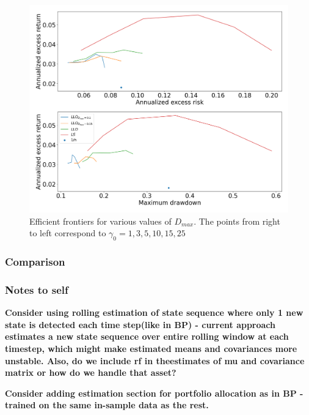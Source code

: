 \begin{figure}[H]
    \centering
    \includegraphics[width=1\textwidth]{analysis/portfolio_exercise/images/mle/frontier_llo.png}
    \caption[Efficient frontiers for various values of $D_{max}$]{Efficient frontiers for various values of $D_{max}$. The points from right to left correspond to $\gamma_0=1,3,5,10,15,25$}
    \label{fig:MPC_frontier_llo}
\end{figure}

\subsubsection{Comparison}



\subsubsection{Notes to self}


\textbf{Consider using rolling estimation of state sequence where only 1 new state is detected each time step(like in BP) - current approach estimates a new state sequence over entire rolling window at each timestep, which might make estimated means and covariances more unstable. Also, do we include rf in theestimates of mu and covariance matrix or how do we handle that asset?}

\textbf{Consider adding estimation section for portfolio allocation as in BP - trained on the same in-sample data as the rest.}